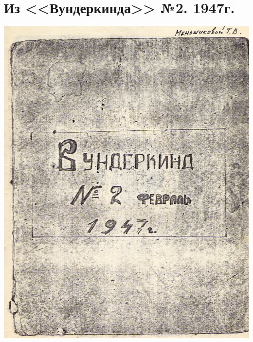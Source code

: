 \section*{Из <<Вундеркинда>> №2. 1947г.}

\noindent
\includegraphics[width=\textwidth]{inc/Vynd/Vynd001}

\newpage

